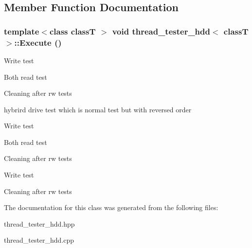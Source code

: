 \subsection{Member Function Documentation}
\hypertarget{classthread__tester__hdd_aad16d6b6f1be66d5e851fa2b0408cf06}{
\subsubsection[{Execute}]{\setlength{\rightskip}{0pt plus 5cm}template$<$class classT $>$ void {\bf thread\_\-tester\_\-hdd}$<$ classT $>$::Execute ()}}
\label{classthread__tester__hdd_aad16d6b6f1be66d5e851fa2b0408cf06}


Write test

Both read test

Cleaning after rw tests

hybrird drive test which is normal test but with reversed order

Write test

Both read test

Cleaning after rw tests

Write test

Cleaning after rw tests 



The documentation for this class was generated from the following files:\begin{DoxyCompactItemize}
\item 
thread\_\-tester\_\-hdd.hpp\item 
thread\_\-tester\_\-hdd.cpp\end{DoxyCompactItemize}

